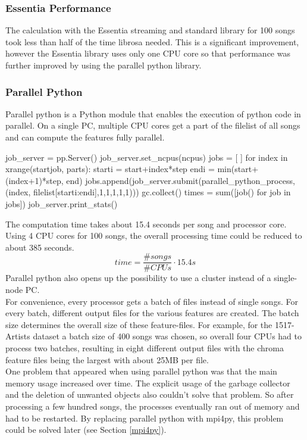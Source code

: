 \subsubsection{Essentia Performance}

The calculation with the Essentia streaming and standard library for 100 songs took less than half of the time librosa needed. This is a significant improvement, however the Essentia library uses only one CPU core so that performance was further improved by using the parallel python library.

\subsubsection{Parallel Python}

Parallel python is a Python module that enables the execution of python code in parallel. On a single PC, multiple CPU cores get a part of the filelist of all songs and can compute the features fully parallel.
\begin{pythonCode}[frame=single,label={lst:pp},caption={Parallel python},captionpos=b]
job_server = pp.Server()
job_server.set_ncpus(ncpus)
jobs = [ ]
for index in xrange(startjob, parts):
	starti = start+index*step
	endi = min(start+(index+1)*step, end)
	jobs.append(job_server.submit(parallel_python_process, (index, 
		filelist[starti:endi],1,1,1,1,1)))
	gc.collect()
times = sum([job() for job in jobs])
job_server.print_stats()
\end{pythonCode}
The computation time takes about 15.4 seconds per song and processor core. Using 4 CPU cores for 100 songs, the overall processing time could be reduced to about 385 seconds. 
\begin{equation} \label{eq:parallelp}
time = \frac{\#songs}{\#CPUs} \cdot 15.4s
\end{equation}
Parallel python also opens up the possibility to use a cluster instead of a single-node PC.\\
For convenience, every processor gets a batch of files instead of single songs. For every batch, different output files for the various features are created. The batch size determines the overall size of these feature-files. For example, for the 1517-Artists dataset a batch size of 400 songs was chosen, so overall four CPUs had to process two batches, resulting in eight different output files with the chroma feature files being the largest with about 25MB per file.\\
One problem that appeared when using parallel python was that the main memory usage increased over time. The explicit usage of the garbage collector and the deletion of unwanted objects also couldn't solve that problem. So after processing a few hundred songs, the processes eventually ran out of memory and had to be restarted. By replacing parallel python with mpi4py, this problem could be solved later (see Section \ref{mpi4py}). 

